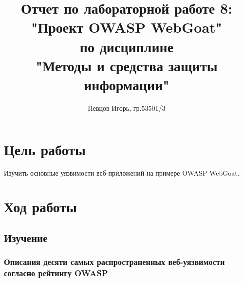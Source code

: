 \documentclass[a4paper, 14pt]{article}				%
\author{Певцов Игорь, гр.53501/3}
\title{Отчет по лабораторной работе 8:\\"Проект OWASP WebGoat"\\ по дисциплине\\"Методы и средства защиты информации"}
\begin{document}
\maketitle

\newpage
\tableofcontents{}

\newpage
\section{Цель работы}
Изучить основные уязвимости веб-приложений на примере OWASP WebGoat.
\section{Ход работы}


\subsection{Изучение}
\subsubsection{Описания десяти самых распространенных веб-уязвимости согласно рейтингу OWASP}
\end{document}
